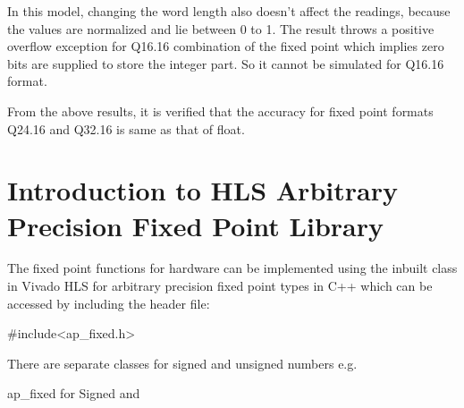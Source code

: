 \vspace{0.25cm}
\noindent In this model, changing the word length also doesn't affect the readings, because the values are normalized and lie between 0 to 1. The result throws a positive overflow exception for Q16.16 combination of the fixed point which implies zero bits are supplied to store the integer part. So it cannot be simulated for Q16.16 format.

\vspace{0.25cm}
\noindent From the above results, it is verified that the accuracy for fixed point formats Q24.16 and Q32.16 is same as that of float.

\section{Introduction to HLS Arbitrary Precision Fixed Point Library}
The fixed point functions for hardware can be implemented using the inbuilt class in Vivado HLS for arbitrary precision fixed point types in C++ which can be accessed by including the header file:

\hspace{3cm}\#include\textless ap\_fixed.h\textgreater

\noindent There are separate classes for signed and unsigned numbers e.g.

\hspace{3cm}ap\_fixed for Signed and 

